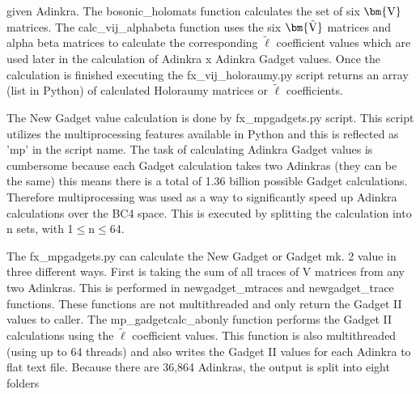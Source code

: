 \documentclass[12pt, letterpaper]{article}
\def\brV{{\bm {\rm V}}}
\def\brtV{{\bm{\tilde{\rm V}}}}
\begin{document}
given Adinkra. The bosonic{\_}holomats function calculates the set of six $\brV$ matrices.
The calc{\_}vij{\_}alphabeta function uses the six $\brtV$ matrices and alpha beta matrices
to calculate the corresponding $\tilde{\ell}$ coefficient values which are used later
in the calculation of Adinkra x Adinkra Gadget values. Once the calculation is finished
executing the fx{\_}vij{\_}holoraumy.py script returns an array (list in Python) of calculated
Holoraumy matrices or $\tilde{\ell}$ coefficients.\par
The New Gadget value calculation is done by fx{\_}mpgadgets.py script. This script utilizes
the multiprocessing features available in Python and this is reflected as 'mp' in the script name.
The task of calculating Adinkra Gadget values is cumbersome because each Gadget calculation
takes two Adinkras (they can be the same) this means there is a total of 1.36 billion possible
Gadget calculations. Therefore multiprocessing was used as a way to significantly speed up
Adinkra calculations over the BC4 space. This is executed by splitting the calculation into n sets,
with 1$\leq$n$\leq$64.\par
The fx{\_}mpgadgets.py can calculate the New Gadget or Gadget mk. 2 value in three different ways.
First is taking the sum of all traces of V matrices from any two Adinkras. This is performed in
newgadget{\_}mtraces and newgadget{\_}trace functions. These functions are not multithreaded and
only return the Gadget II values to caller. The mp{\_}gadgetcalc{\_}abonly function performs the
Gadget II calculations using the $\tilde{\ell}$ coefficient values. This function is also
multithreaded (using up to 64 threads) and also writes the Gadget II values for each Adinkra to
flat text file. Because there are 36,864 Adinkras, the output is split into eight folders
\end{document}
